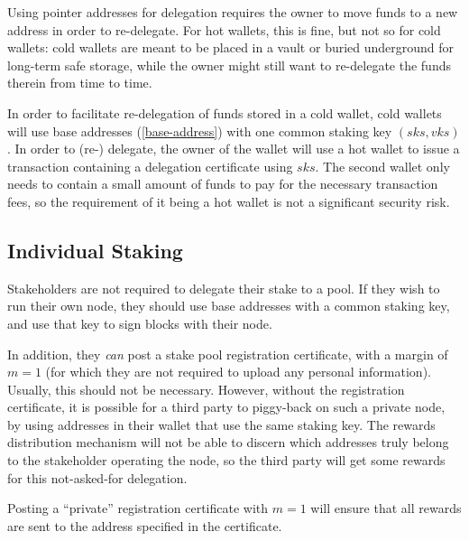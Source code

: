 \documentclass[11pt,a4paper]{article}
\begin{document}
Using pointer addresses for delegation requires the owner to move funds
to a new address in order to re-delegate. For hot wallets, this is fine,
but not so for cold wallets: cold wallets are meant to be placed in a
vault or buried underground for long-term safe storage, while the owner
might still want to re-delegate the funds therein from time to time.

In order to facilitate re-delegation of funds stored in a cold wallet,
cold wallets will use base addresses (\ref{base-address}) with one
common staking key \((sks, vks)\). In order to (re-) delegate, the owner
of the wallet will use a hot wallet to issue a transaction containing a
delegation certificate using \(sks\). The second wallet only needs to
contain a small amount of funds to pay for the necessary transaction
fees, so the requirement of it being a hot wallet is not a significant
security risk.

\subsection{Individual Staking}\label{individual-staking}

Stakeholders are not required to delegate their stake to a pool. If they
wish to run their own node, they should use base addresses with a common
staking key, and use that key to sign blocks with their node.

In addition, they \emph{can} post a stake pool registration certificate,
with a margin of \(m=1\) (for which they are not required to upload any
personal information). Usually, this should not be necessary. However,
without the registration certificate, it is possible for a third party
to piggy-back on such a private node, by using addresses in their wallet
that use the same staking key. The rewards distribution mechanism will
not be able to discern which addresses truly belong to the stakeholder
operating the node, so the third party will get some rewards for this
not-asked-for delegation.

Posting a ``private'' registration certificate with \(m=1\) will ensure
that all rewards are sent to the address specified in the certificate.

\end{document}
